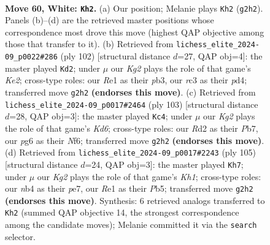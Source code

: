 \documentclass[11pt]{article}
\begin{document}
\clearpage

\begin{figure}[p]\centering
\begin{subfigure}{0.46\textwidth}\centering
\resizebox{\linewidth}{!}{%
\newchessgame
\chessboard[
  setfen={1k6/1p5p/6pP/p4p2/1n3P2/2r5/3R2K1/4R3 w - - 7 60},
  showmover=false,
  pgfstyle=straightmove, color=movearrow, markmove={g2-h2}
]}
\caption{}
\end{subfigure}\hfill
\begin{subfigure}{0.46\textwidth}\centering
\resizebox{\linewidth}{!}{%
\newchessgame
\chessboard[
  setfen={8/P7/Bn4p1/4kp2/3p3p/1p5P/4K1P1/8 w - - 0 52},
  showmover=false,
  pgfstyle=straightmove, color=movearrow, markmove={e2-d2}
]}
\caption{}
\end{subfigure}
\\[4pt]
\begin{subfigure}{0.46\textwidth}\centering
\resizebox{\linewidth}{!}{%
\newchessgame
\chessboard[
  setfen={8/1p6/5np1/1P3p2/PB5P/3k2P1/5K2/8 b - - 2 52},
  showmover=false,
  pgfstyle=straightmove, color=movearrow, markmove={d3-c4}
]}
\caption{}
\end{subfigure}\hfill
\begin{subfigure}{0.46\textwidth}\centering
\resizebox{\linewidth}{!}{%
\newchessgame
\chessboard[
  setfen={1r5k/4P3/5K1p/pp5P/8/2P3R1/1P6/8 b - - 0 53},
  showmover=false,
  pgfstyle=straightmove, color=movearrow, markmove={h8-h7}
]}
\caption{}
\end{subfigure}
\caption{\textbf{Move 60, White: \texttt{Kh2}.} (a) Our position; Melanie plays \texttt{Kh2} (\texttt{g2h2}). Panels (b)--(d) are the retrieved master positions whose correspondence most drove this move (highest QAP objective among those that transfer to it). (b) Retrieved from \texttt{lichess\_elite\_2024-09\_p0022\#286} (ply 102) [structural distance $d$=27, QAP obj=4]: the master played \texttt{Kd2}; under $\mu$ our \emph{Kg2} plays the role of that game's \emph{Ke2}; cross-type roles: our \emph{R}e1 as their \emph{p}b3, our \emph{r}c3 as their \emph{p}d4; transferred move \texttt{g2h2} \textbf{(endorses this move)}. (c) Retrieved from \texttt{lichess\_elite\_2024-09\_p0017\#2464} (ply 103) [structural distance $d$=28, QAP obj=3]: the master played \texttt{Kc4}; under $\mu$ our \emph{Kg2} plays the role of that game's \emph{Kd6}; cross-type roles: our \emph{R}d2 as their \emph{P}b7, our \emph{p}g6 as their \emph{N}f6; transferred move \texttt{g2h2} \textbf{(endorses this move)}. (d) Retrieved from \texttt{lichess\_elite\_2024-09\_p0017\#2243} (ply 105) [structural distance $d$=24, QAP obj=3]: the master played \texttt{Kh7}; under $\mu$ our \emph{Kg2} plays the role of that game's \emph{Kh1}; cross-type roles: our \emph{n}b4 as their \emph{p}e7, our \emph{R}e1 as their \emph{P}b5; transferred move \texttt{g2h2} \textbf{(endorses this move)}. Synthesis: 6 retrieved analogs transferred to \texttt{Kh2} (summed QAP objective 14, the strongest correspondence among the candidate moves); Melanie committed it via the \texttt{search} selector.}
\label{fig:thought-m118}
\end{figure}
\end{document}
